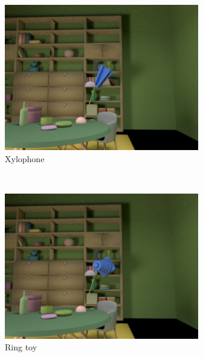 \documentclass{jov}
\begin{document}
\begin{figure}[h]
    \begin{subfigure}[b]{0.22 \textwidth}
        \includegraphics[width=\textwidth]{../Figures/Figure10/Figure10_d.png}
        \caption{Xylophone}
        \label{fig:libraryWithXylophone}
    \end{subfigure}
    ~
	\begin{subfigure}[b]{0.22 \textwidth}
        \includegraphics[width=\textwidth]{../Figures/Figure10/Figure10_e.png}
        \caption{Ring toy}
        \label{fig:libraryWithRingToy}
    \end{subfigure}
        ~
    	\begin{subfigure}[b]{0.22 \textwidth}

\end{subfigure}
\end{figure}
\end{document}
